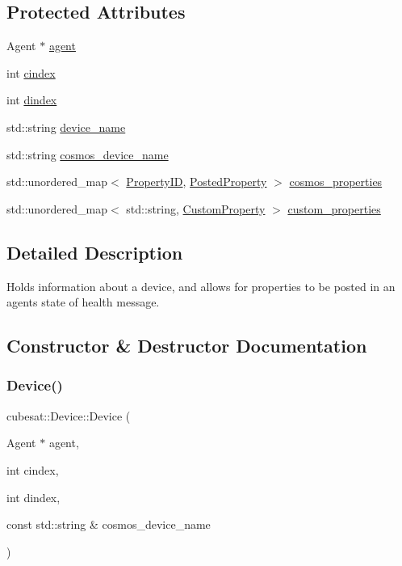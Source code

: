 \subsection*{Protected Attributes}
\begin{DoxyCompactItemize}
\item 
Agent $\ast$ \hyperlink{classcubesat_1_1Device_a8499108eccaf7375bea8ead0182391a6}{agent}
\item 
int \hyperlink{classcubesat_1_1Device_a1deca725b01f8ef37e49662da6db4e53}{cindex}
\item 
int \hyperlink{classcubesat_1_1Device_a8a2b3d6d7400e6796c31705058172982}{dindex}
\item 
std\+::string \hyperlink{classcubesat_1_1Device_abb55814f123cad387d84a0802da29bd7}{device\+\_\+name}
\item 
std\+::string \hyperlink{classcubesat_1_1Device_a90904a89fe9cf559e50028a7d0cb878f}{cosmos\+\_\+device\+\_\+name}
\item 
std\+::unordered\+\_\+map$<$ \hyperlink{namespacecubesat_ab5c769503b8a77bc90a47ca8705f2f86}{Property\+ID}, \hyperlink{structcubesat_1_1Device_1_1PostedProperty}{Posted\+Property} $>$ \hyperlink{classcubesat_1_1Device_aa12c15d56be320bc229860435d978daa}{cosmos\+\_\+properties}
\item 
std\+::unordered\+\_\+map$<$ std\+::string, \hyperlink{structcubesat_1_1Device_1_1CustomProperty}{Custom\+Property} $>$ \hyperlink{classcubesat_1_1Device_ac33865cb515998cebccdc6186f70921d}{custom\+\_\+properties}
\end{DoxyCompactItemize}


\subsection{Detailed Description}
Holds information about a device, and allows for properties to be posted in an agent\textquotesingle{}s state of health message. 

\subsection{Constructor \& Destructor Documentation}
\mbox{\label{classcubesat_1_1Device_a19869b78d586dff676fa6ef25ccaa779}} 
\subsubsection{\texorpdfstring{Device()}{Device()}}
{\footnotesize\ttfamily cubesat\+::\+Device\+::\+Device (\begin{DoxyParamCaption}\item[{Agent $\ast$}]{agent,  }\item[{int}]{cindex,  }\item[{int}]{dindex,  }\item[{const std\+::string \&}]{cosmos\+\_\+device\+\_\+name }\end{DoxyParamCaption})\hspace{0.3cm}{\ttfamily [inline]}}



